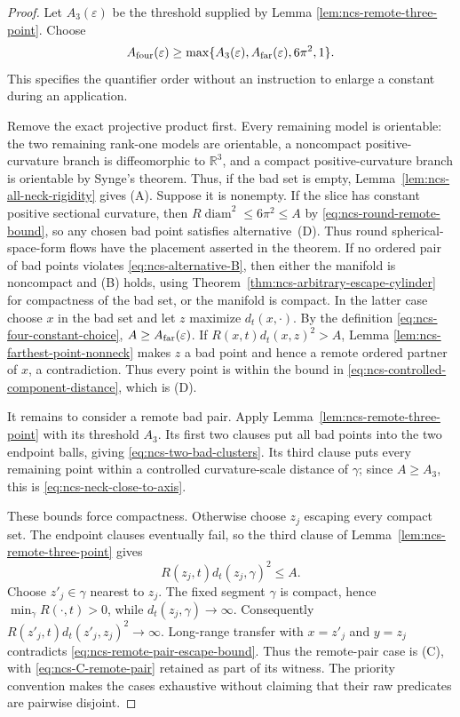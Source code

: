 \documentclass[10pt]{coll-l}
\newcommand{\R}{\mathbb{R}}
\theoremstyle{definition}
\theoremstyle{remark}
\numberwithin{section}{chapter}
\numberwithin{equation}{chapter}
\begin{document}
\begin{proof}
Let $A_3(\varepsilon)$ be the threshold supplied by Lemma
\ref{lem:ncs-remote-three-point}.  Choose
\begin{equation}
 A_{\rm four}(\varepsilon)
   \geq\max\{A_3(\varepsilon),A_{\rm far}(\varepsilon),
                    6\pi^2,1\}.                              \label{eq:ncs-four-constant-choice}
\end{equation}
This specifies the quantifier order without an instruction to enlarge a
constant during an application.

Remove the exact projective product first.  Every remaining model is
orientable: the two remaining rank-one models are orientable, a
noncompact positive-curvature branch is diffeomorphic to $\R^3$, and a
compact positive-curvature branch is orientable by Synge's theorem.  Thus,
if the bad set is empty, Lemma~\ref{lem:ncs-all-neck-rigidity} gives (A).
Suppose it is nonempty.
If the slice has constant positive sectional curvature, then
$R\operatorname{diam}^2\leq6\pi^2\leq A$ by
\eqref{eq:ncs-round-remote-bound}, so any chosen bad point satisfies
alternative~(D).  Thus round spherical-space-form flows have the placement
asserted in the theorem.
If no ordered pair of bad points violates
\eqref{eq:ncs-alternative-B}, then either the manifold is noncompact and
(B) holds, using Theorem~\ref{thm:ncs-arbitrary-escape-cylinder} for
compactness of the bad set, or the manifold is compact.  In the latter
      case choose $x$ in the bad set and let $z$ maximize $d_t(x,\cdot)$.
By the definition \eqref{eq:ncs-four-constant-choice},
$A\geq A_{\rm far}(\varepsilon)$.  If
$R(x,t)d_t(x,z)^2>A$, Lemma
\ref{lem:ncs-farthest-point-nonneck} makes $z$ a bad point and hence a
remote ordered partner of $x$, a contradiction.  Thus every point is
within the bound in \eqref{eq:ncs-controlled-component-distance}, which is
(D).

It remains to consider a remote bad pair.  Apply
Lemma~\ref{lem:ncs-remote-three-point} with its threshold $A_3$.  Its first two clauses put all bad
points into the two endpoint balls, giving
\eqref{eq:ncs-two-bad-clusters}.  Its third clause puts every remaining
point within a controlled curvature-scale distance of $\gamma$; since
$A\geq A_3$, this is \eqref{eq:ncs-neck-close-to-axis}.

These bounds force compactness.  Otherwise choose $z_j$ escaping every
compact set.  The endpoint clauses eventually fail, so the third clause of
Lemma~\ref{lem:ncs-remote-three-point} gives
\begin{equation}
                  R(z_j,t)d_t(z_j,\gamma)^2\leq A.    \label{eq:ncs-remote-pair-escape-bound}
\end{equation}
Choose $z'_j\in\gamma$ nearest to $z_j$.  The fixed segment $\gamma$ is
compact, hence $\min_\gamma R(\cdot,t)>0$, while
$d_t(z_j,\gamma)\to\infty$.  Consequently
$R(z'_j,t)d_t(z'_j,z_j)^2\to\infty$.  Long-range transfer with
$x=z'_j$ and $y=z_j$ contradicts
\eqref{eq:ncs-remote-pair-escape-bound}.  Thus the remote-pair case is
(C), with \eqref{eq:ncs-C-remote-pair} retained as part of its witness.
The priority convention makes the cases exhaustive without claiming that
their raw predicates are pairwise disjoint.
\end{proof}
\end{document}
